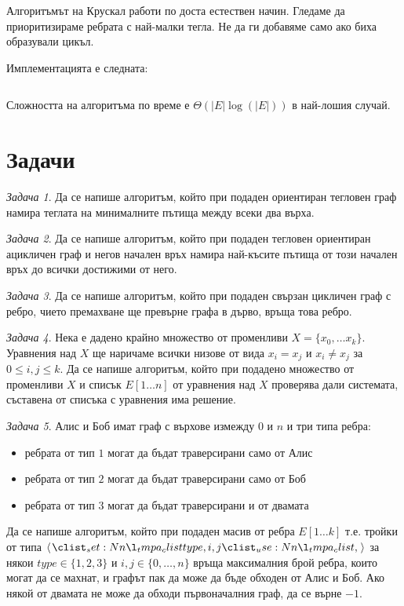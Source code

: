 \documentclass{article}
\theoremstyle{definition}
\theoremstyle{plain}
\theoremstyle{remark}
\newtheorem{problem}{Задача}
\theoremstyle{definition}
\begin{document}
Алгоритъмът на Крускал работи по доста естествен начин.
Гледаме да приоритизираме ребрата с най-малки тегла.
Не да ги добавяме само ако биха образували цикъл.

Имплементацията е следната:
\inputminted[linenos]{c++}{algorithms/kruskal.cpp}
Сложността на алгоритъма по време е $\Theta(|E|\log(|E|))$ в най-лошия случай.

\section*{Задачи}

\begin{problem}
Да се напише алгоритъм, който при подаден ориентиран тегловен граф намира теглата на минималните пътища между всеки два върха.
\end{problem}

\begin{problem}
Да се напише алгоритъм, който при подаден тегловен ориентиран ацикличен граф и негов начален връх намира най-късите пътища от този начален връх до всички достижими от него.
\end{problem}

\begin{problem}
Да се напише алгоритъм, който при подаден свързан цикличен граф с ребро, чието премахване ще превърне графа в дърво, връща това ребро.
\end{problem}

\begin{problem}
Нека е дадено крайно множество от променливи $X = \{ x_0, \dots x_k \}$.
Уравнения над $X$ ще наричаме всички низове от вида $x_i = x_j$ и $x_i \neq x_j$ за $0 \leq i, j \leq k$.
Да се напише алгоритъм, който при подадено множество от променливи $X$ и списък $E[1 \dots n]$ от уравнения над $X$ проверява дали системата, съставена от списъка с уравнения има решение.
\end{problem}

\begin{problem}
Алис и Боб имат граф с върхове измежду $0$ и $n$ и три типа ребра:
\begin{itemize}
  \item ребрата от тип $1$ могат да бъдат траверсирани само от Алис
  \item ребрата от тип $2$ могат да бъдат траверсирани само от Боб
  \item ребрата от тип $3$ могат да бъдат траверсирани и от двамата
\end{itemize}
Да се напише алгоритъм, който при подаден масив от ребра $E[1 \dots k]$ т.е. тройки от типа $\opair{type, i, j}$ за някои $type \in \{1, 2, 3\}$ и $i, j \in \{ 0, \dots, n \}$ връща максималния брой ребра, които могат да се махнат, и графът пак да може да бъде обходен от Алис и Боб.
Ако някой от двамата не може да обходи първоначалния граф, да се върне $-1$.
\end{problem}
\end{document}

